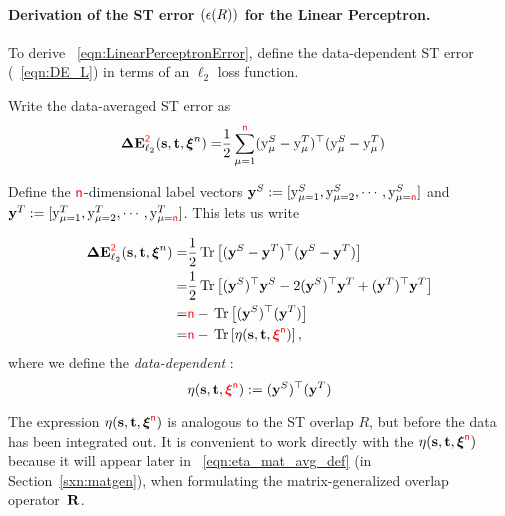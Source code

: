 \paragraph{Derivation of the  ST error $(\epsilon(R))$ for the Linear Perceptron.}
To derive \EQN~\ref{eqn:LinearPerceptronError},
define the data-dependent ST error (\EQN~\ref{eqn:DE_L}) in terms of an $\ell_2$ loss function.

Write the data-averaged ST error as
\begin{align}
\nonumber
\DETOPSTLL= & \frac{1}{2} \sum_{\mu=1}^{\ND}(\Ys - \Yt)^{\top} (\Ys - \Yt)
\label{eqn:defineTerror}
\end{align}

Define the ${\color{red}\sf{n}}$-dimensional label vectors  
$\mathbf{y}^{S}:=[\mathrm{y}_{\mu=1}^{S}, \mathrm{y}_{\mu=2}^{S}, \cdots, \mathrm{y}_{\mu={\color{red}\sf{n}}}^{S}]$ and 
$\mathbf{y}^{T}:=[\mathrm{y}_{\mu=1}^{T}, \mathrm{y}_{\mu=2}^{T}, \cdots, \mathrm{y}_{\mu={\color{red}\sf{n}}}^{T}]$.
This lets us write 

\begin{align}
\nonumber
\DETOPSTLL= & \frac{1}{2} \Trace{(\YsVEC - \YtVEC)^{\top} (\YsVEC - \YtVEC)} \\
\nonumber
=& \frac{1}{2} \Trace{(\YsVEC)^{\top} \YsVEC - 2 (\YsVEC)^{\top} \YtVEC + (\YtVEC)^{\top} \YtVEC } \\
\nonumber
=& \ND - \Trace{(\YsVEC)^{\top} (\YtVEC)}\\
\label{eqn:deriveSTerror}
=& \ND- \Trace{\ETA(\SVEC,\TVEC,\red{\NDXI})},
\end{align}
where we define the \emph{data-dependent \SelfOverlap}:
\begin{equation}
\eta({\mathbf{s}},{\mathbf{t}},{\color{red}\sf{\boldsymbol{\xi}^{{\color{red}\sf{n}}}}}):=(\mathbf{y}^{S})^{\top}(\mathbf{y}^{T})
\end{equation}

The expression $\eta({\mathbf{s}},{\mathbf{t}},\boldsymbol{\xi}^{{\color{red}\sf{n}}})$ is analogous to the ST overlap $R$, but before the data has been integrated out.
It is convenient to work directly with
the \SelfOverlap $\eta({\mathbf{s}},{\mathbf{t}},\boldsymbol{\xi}^{{\color{red}\sf{n}}})$ because it will appear later in \EQN~\ref{eqn:eta_mat_avg_def} (in Section~\ref{sxn:matgen}), 
when formulating the matrix-generalized overlap operator~$\mathbf{R}$.

